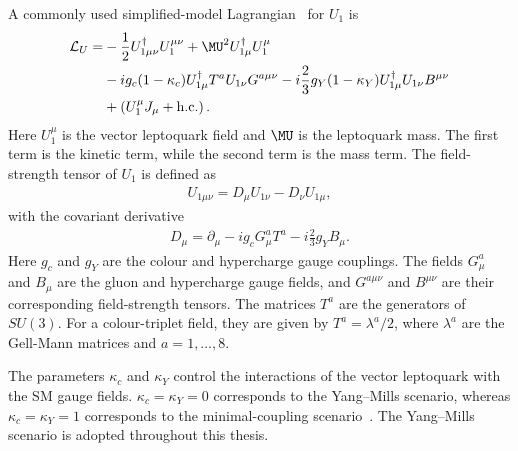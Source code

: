 A commonly used simplified-model Lagrangian~\cite{Cornella2019} for $U_{1}$ is
\begin{align}
    \mathcal{L}_{U}
    =
    &
    -\frac{1}{2}
    U_{1\mu\nu}^{\dagger}
    U_{1}^{\mu\nu}
    +
    \MU^{2}
    U_{1\mu}^{\dagger}
    U_{1}^{\mu}
    \nonumber\\
    &
    -ig_{c}(1-\kappa_{c})
    U_{1\mu}^{\dagger}
    T^{a}
    U_{1\nu}
    G^{a\mu\nu}
    -
    i\frac{2}{3}g_{Y}(1-\kappa_{Y})
    U_{1\mu}^{\dagger}
    U_{1\nu}
    B^{\mu\nu}
    \nonumber\\
    &
    +
    \left(
        U_{1}^{\mu}J_{\mu}
        +
        \mathrm{h.c.}
    \right).
    \label{eq:u1_full_lagrangian}
\end{align}
Here $U_{1}^{\mu}$ is the vector leptoquark field and $\MU$ is the leptoquark mass. 
The first term is the kinetic term, while the second term is the mass term. 
The field-strength tensor of $U_{1}$ is defined as
\begin{align}
    U_{1\mu\nu}
    =
    D_{\mu}U_{1\nu}
    -
    D_{\nu}U_{1\mu},
    \label{eq:u1_field_strength}
\end{align}
with the covariant derivative
\begin{align}
    D_{\mu}
    =
    \partial_{\mu}
    -
    ig_{c}G_{\mu}^{a}T^{a}
    -
    i\frac{2}{3}g_{Y}B_{\mu}.
    \label{eq:u1_covariant_derivative}
\end{align}
Here $g_{c}$ and $g_{Y}$ are the colour and hypercharge gauge couplings. 
The fields $G_{\mu}^{a}$ and $B_{\mu}$ are the gluon and hypercharge gauge fields, and $G^{a\mu\nu}$ and $B^{\mu\nu}$ are their corresponding field-strength tensors. 
The matrices $T^{a}$ are the generators of $SU(3)$. 
For a colour-triplet field, they are given by $T^{a}=\lambda^{a}/2$, where $\lambda^{a}$ are the Gell-Mann matrices and $a=1,\ldots,8$.

The parameters $\kappa_{c}$ and $\kappa_{Y}$ control the interactions
of the vector leptoquark with the SM gauge fields.
$\kappa_{c}=\kappa_{Y}=0$ corresponds to the Yang--Mills scenario,
whereas $\kappa_{c}=\kappa_{Y}=1$ corresponds to the minimal-coupling
scenario~\cite{Cornella2019,Baker2019HighPTU1}.
The Yang--Mills scenario is adopted throughout this thesis.

